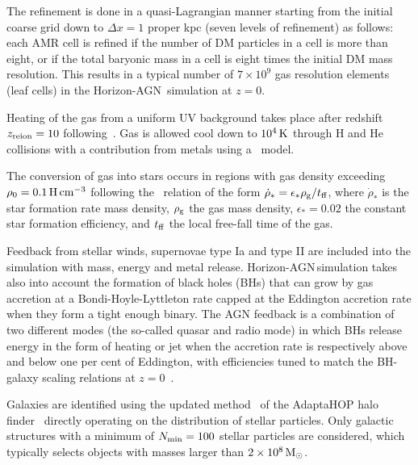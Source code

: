 \documentclass[useAMS,usenatbib]{mnras}
\newcommand{\hagn}{\mbox{{\sc \small Horizon-AGN}}}
\begin{document}
 The refinement is done in a quasi-Lagrangian manner starting from the initial coarse grid down to $\Delta x=1$ proper kpc (seven levels of refinement) as follows: each AMR cell is refined if the number of DM particles in a cell is more than eight, or if the total baryonic mass in a cell is eight times the initial DM mass resolution. This results in a typical number of $7\times 10^9$ gas resolution elements (leaf cells) in the \hagn\, simulation at $z=0$.
  
Heating of the gas from a uniform UV background takes place after redshift $z_{\rm  reion} = 10$ following~\cite{Haardt1996}. Gas is allowed cool down to $10^4\, \rm K$ through H and He collisions with a contribution from metals using a~\cite{Sutherland1993} model. 

The conversion of gas into stars occurs in regions with gas density exceeding $\rho_0=0.1\, \rm H\, cm^{-3}$ following the~\cite{Schmidt1959} relation of the form $\dot \rho_*= \epsilon_* {\rho_{\rm g} / t_{\rm  ff}}$, where $\dot \rho_*$ is the star formation rate mass density, $\rho_{\rm g}$ the gas mass density, $\epsilon_*=0.02$ the constant star formation efficiency, and $t_{\rm  ff}$ the local free-fall time of the gas.

Feedback from stellar winds, supernovae type Ia and type II are included into the simulation with mass, energy and metal release. \hagn\,simulation takes also into account the formation of black holes (BHs) that can grow by gas accretion at a Bondi-Hoyle-Lyttleton rate capped at  the Eddington accretion rate when they form a tight enough binary.
The AGN feedback is a combination of two different modes (the so-called quasar and radio mode) in which
BHs release energy in the form of heating or jet when the accretion rate is respectively above and below one per cent of Eddington, with efficiencies tuned to match the BH-galaxy scaling relations at $z=0$~\citep[see][for details]{Dubois2012}.

Galaxies are identified using the updated method~\citep{Tweed2009} of the AdaptaHOP halo finder~\citep{Aubert2004} directly operating on the distribution of stellar particles. Only galactic structures with a minimum of $N_{\rm  min}=100$ stellar particles are considered, which typically selects objects with masses larger than  $2 \times 10^8 \, \rm M_\odot$. 



\end{document}
